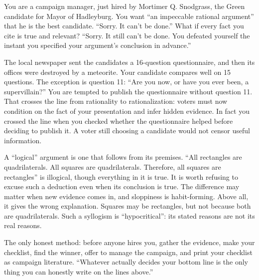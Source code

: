
You are a campaign manager, just hired by Mortimer Q. Snodgrass, the Green candidate for Mayor of Hadleyburg.  You want ``an impeccable rational argument'' that he is the best candidate. ``Sorry. It can't be done.'' What if every fact you cite is true and relevant? ``Sorry. It still can't be done. You defeated yourself the instant you specified your argument's conclusion in advance.'' 

The local newspaper sent the candidates a 16-question questionnaire, and then its offices were destroyed by a meteorite. Your candidate compares well on 15 questions. The exception is question 11: ``Are you now, or have you ever been, a supervillain?'' You are tempted to publish the questionnaire without question 11. That crosses the line from rationality to rationalization: voters must now condition on the fact of your presentation and infer hidden evidence. In fact you crossed the line when you checked whether the questionnaire helped before deciding to publish it. A voter still choosing a candidate would not censor useful information.

A ``logical'' argument is one that follows from its premises. ``All rectangles are quadrilaterals. All squares are quadrilaterals. Therefore, all squares are rectangles'' is illogical, though everything in it is true. It is worth refusing to excuse such a deduction even when its conclusion is true. The difference may matter when new evidence comes in, and sloppiness is habit-forming. Above all, it gives the wrong explanation. Squares may be rectangles, but not because both are quadrilaterals. Such a syllogism is ``hypocritical'': its stated reasons are not its real reasons. 

The only honest method: before anyone hires you, gather the evidence, make your checklist, find the winner, offer to manage the campaign, and print your checklist as campaign literature. ``Whatever actually decides your bottom line is the only thing you can honestly write on the lines above.'' 
